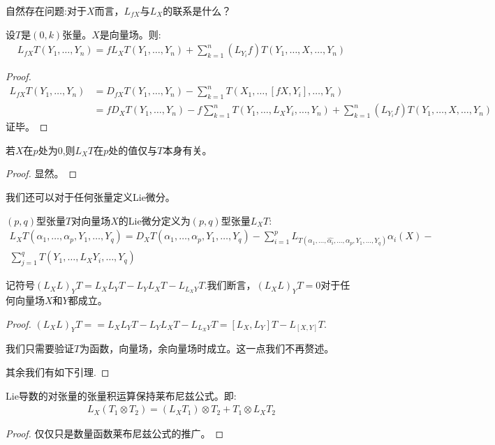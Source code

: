 自然存在问题:对于$X$而言，$L_{fX}$与$L_X$的联系是什么？
\begin{proposition}
    设$T$是$(0,k)$张量。$X$是向量场。则:
    \begin{align*}
        L_{fX}T(Y_1,\dots,Y_n)=fL_X T(Y_1,\dots,Y_n)+\sum_{k=1}^n (L_{Y_i}f) T(Y_1,\dots,X,\dots,Y_n)
    \end{align*}
\end{proposition}
\begin{proof}
    \begin{align*}
         L_{fX}T(Y_1,\dots,Y_n)&=D_{fX}T(Y_1,\dots,Y_n)-\sum_{k=1}^n T(X_1,\dots,[fX,Y_i],\dots,Y_n)\\&=fD_XT(Y_1,\dots,Y_n)-f\sum_{k=1}^n T(Y_1,\dots,L_X Y_i,\dots,Y_n)+\sum_{k=1}^n (L_{Y_i}f) T(Y_1,\dots,X,\dots,Y_n)
    \end{align*}
    证毕。
\end{proof}

\begin{lemma}
    若$X$在$p$处为$0$,则$L_X T$在$p$处的值仅与$T$本身有关。
\end{lemma}
\begin{proof}
    显然。
\end{proof}
我们还可以对于任何张量定义Lie微分。
\begin{definition}
     $(p,q)$型张量$T$对向量场$X$的Lie微分定义为$(p,q)$型张量$L_X T$:
     \begin{align*}
        L_X T(\alpha_1,\dots,\alpha_p,Y_1,\dots,Y_q)=D_X T(\alpha_1,\dots,\alpha_p,Y_1,\dots,Y_q)-\sum_{i=1}^p L_{T(\alpha_1,\dots,\hat{\alpha_i},\dots,\alpha_p,Y_1,\dots,Y_q)}\alpha_i(X)-\\ \sum_{j=1}^q T(Y_1,\dots,L_X Y_i,\dots,Y_q)
     \end{align*}
\end{definition}

\begin{theorem}[广义雅可比恒等式]
    记符号$(L_X L)_Y T=L_X L_Y T-L_YL_X T-L_{L_X Y}T$.我们断言，$(L_X L)_Y T=0$对于任何向量场$X$和$Y$都成立。
\end{theorem}
\begin{proof}
    $(L_X L)_Y T==L_X L_Y T-L_YL_X T-L_{L_X Y}T=[L_X,L_Y]T-L_{[X,Y]}T$.

    我们只需要验证$T$为函数，向量场，余向量场时成立。这一点我们不再赘述。
    
    其余我们有如下引理.
\end{proof}
\begin{lemma}
    Lie导数的对张量的张量积运算保持莱布尼兹公式。即:
    \begin{align*}
        L_X(T_1\otimes T_2)=(L_X T_1)\otimes T_2+T_1\otimes L_X T_2
    \end{align*}
\end{lemma}
\begin{proof}
    仅仅只是数量函数莱布尼兹公式的推广。
\end{proof}
